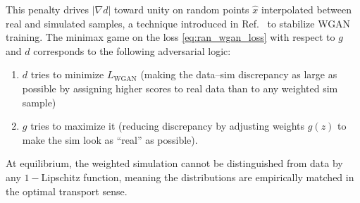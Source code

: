             This penalty drives $|\nabla d|$ toward unity on random points $\hat{x}$ interpolated between real and simulated samples, a technique introduced in Ref.~ to stabilize WGAN training.
            The minimax game on the loss \eqref{eq:ran_wgan_loss} with respect to $g$ and $d$ corresponds to the following adversarial logic:
            \begin{enumerate}
                \item $d$ tries to minimize $L_{\text{WGAN}}$ (making the data–sim discrepancy as large as possible by assigning higher scores to real data than to any weighted sim sample)
                \item $g$ tries to maximize it (reducing discrepancy by adjusting weights $g(z)$ to make the sim look as “real” as possible).
            \end{enumerate}
            At equilibrium, the weighted simulation cannot be distinguished from data by any \(1-\)Lipschitz function, meaning the distributions are empirically matched in the optimal transport sense.
    
